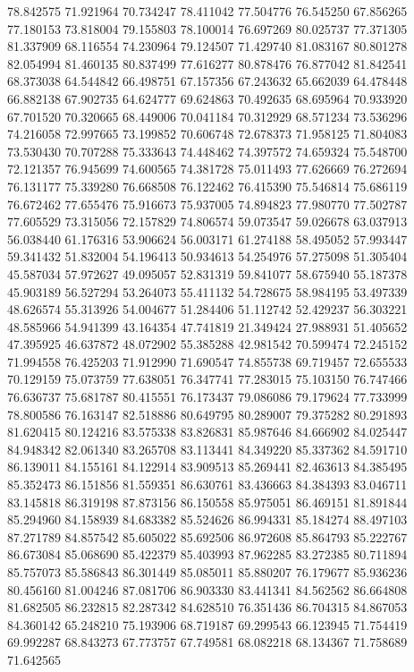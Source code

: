 78.842575
71.921964
70.734247
78.411042
77.504776
76.545250
67.856265
77.180153
73.818004
79.155803
78.100014
76.697269
80.025737
77.371305
81.337909
68.116554
74.230964
79.124507
71.429740
81.083167
80.801278
82.054994
81.460135
80.837499
77.616277
80.878476
76.877042
81.842541
68.373038
64.544842
66.498751
67.157356
67.243632
65.662039
64.478448
66.882138
67.902735
64.624777
69.624863
70.492635
68.695964
70.933920
67.701520
70.320665
68.449006
70.041184
70.312929
68.571234
73.536296
74.216058
72.997665
73.199852
70.606748
72.678373
71.958125
71.804083
73.530430
70.707288
75.333643
74.448462
74.397572
74.659324
75.548700
72.121357
76.945699
74.600565
74.381728
75.011493
77.626669
76.272694
76.131177
75.339280
76.668508
76.122462
76.415390
75.546814
75.686119
76.672462
77.655476
75.916673
75.937005
74.894823
77.980770
77.502787
77.605529
73.315056
72.157829
74.806574
59.073547
59.026678
63.037913
56.038440
61.176316
53.906624
56.003171
61.274188
58.495052
57.993447
59.341432
51.832004
54.196413
50.934613
54.254976
57.275098
51.305404
45.587034
57.972627
49.095057
52.831319
59.841077
58.675940
55.187378
45.903189
56.527294
53.264073
55.411132
54.728675
58.984195
53.497339
48.626574
55.313926
54.004677
51.284406
51.112742
52.429237
56.303221
48.585966
54.941399
43.164354
47.741819
21.349424
27.988931
51.405652
47.395925
46.637872
48.072902
55.385288
42.981542
70.599474
72.245152
71.994558
76.425203
71.912990
71.690547
74.855738
69.719457
72.655533
70.129159
75.073759
77.638051
76.347741
77.283015
75.103150
76.747466
76.636737
75.681787
80.415551
76.173437
79.086086
79.179624
77.733999
78.800586
76.163147
82.518886
80.649795
80.289007
79.375282
80.291893
81.620415
80.124216
83.575338
83.826831
85.987646
84.666902
84.025447
84.948342
82.061340
83.265708
83.113441
84.349220
85.337362
84.591710
86.139011
84.155161
84.122914
83.909513
85.269441
82.463613
84.385495
85.352473
86.151856
81.559351
86.630761
83.436663
84.384393
83.046711
83.145818
86.319198
87.873156
86.150558
85.975051
86.469151
81.891844
85.294960
84.158939
84.683382
85.524626
86.994331
85.184274
88.497103
87.271789
84.857542
85.605022
85.692506
86.972608
85.864793
85.222767
86.673084
85.068690
85.422379
85.403993
87.962285
83.272385
80.711894
85.757073
85.586843
86.301449
85.085011
85.880207
76.179677
85.936236
80.456160
81.004246
87.081706
86.903330
83.441341
84.562562
86.664808
81.682505
86.232815
82.287342
84.628510
76.351436
86.704315
84.867053
84.360142
65.248210
75.193906
68.719187
69.299543
66.123945
71.754419
69.992287
68.843273
67.773757
67.749581
68.082218
68.134367
71.758689
71.642565
